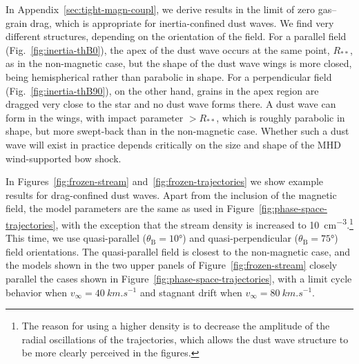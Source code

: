 \message{ !name(dusty-bow-wave.tex)}\documentclass[useAMS, usenatbib, a4paper]{mnras}
\newcommand{\B}{\ensuremath{_{\scriptscriptstyle\text{B}}}}
\newcommand\starstar{\ensuremath{_{**}}}
\begin{document}
In Appendix~\ref{sec:tight-magn-coupl}, we derive results in the limit
of zero gas--grain drag, which is appropriate for inertia-confined dust
waves. We find very different structures, depending on the orientation
of the field.  For a parallel field (Fig.~\ref{fig:inertia-thB0}), the
apex of the dust wave occurs at the same point, \(R\starstar\), as in
the non-magnetic case, but the shape of the dust wave wings is more
closed, being hemispherical rather than parabolic in shape.  For a
perpendicular field (Fig.~\ref{fig:inertia-thB90}), on the other hand,
grains in the apex region are dragged very close to the star and no
dust wave forms there.  A dust wave can form in the wings, with impact
parameter \(> R\starstar\), which is roughly parabolic in shape, but
more swept-back than in the non-magnetic case.  Whether such a dust
wave will exist in practice depends critically on the size and shape
of the MHD wind-supported bow shock.

In Figures~\ref{fig:frozen-stream} and~\ref{fig:frozen-trajectories}
we show example results for drag-confined dust waves. Apart from the
inclusion of the magnetic field, the model parameters are the same as
used in Figure~\ref{fig:phase-space-trajectories}, with the exception
that the stream density is increased to \SI{10}{cm^{-3}}.\footnote{The
  reason for using a higher density is to decrease the amplitude of
  the radial oscillations of the trajectories, which allows the dust
  wave structure to be more clearly perceived in the figures. } This
time, we use quasi-parallel (\(\theta\B = \ang{10}\)) and
quasi-perpendicular (\(\theta\B = \ang{75}\)) field orientations.  The
quasi-parallel field is closest to the non-magnetic case, and the
models shown in the two upper panels of Figure~\ref{fig:frozen-stream} closely parallel the cases shown in Figure~\ref{fig:phase-space-trajectories}, with a limit cycle behavior when \(v_\infty = \SI{40}{km.s^{-1}}\) and stagnant drift when \(v_\infty = \SI{80}{km.s^{-1}}\). 





\end{document}

